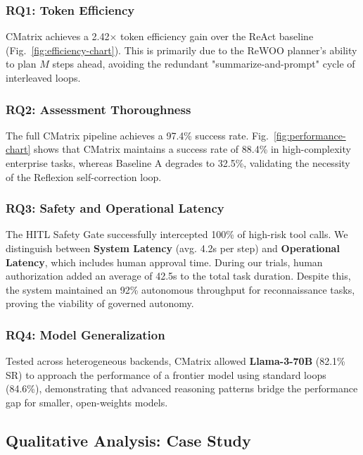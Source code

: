 

\subsubsection{RQ1: Token Efficiency}
CMatrix achieves a 2.42$\times$ token efficiency gain over the ReAct baseline (Fig.~\ref{fig:efficiency-chart}). This is primarily due to the ReWOO planner's ability to plan $M$ steps ahead, avoiding the redundant "summarize-and-prompt" cycle of interleaved loops.



\subsubsection{RQ2: Assessment Thoroughness}
The full CMatrix pipeline achieves a 97.4\% success rate. Fig.~\ref{fig:performance-chart} shows that CMatrix maintains a success rate of 88.4\% in high-complexity enterprise tasks, whereas Baseline A degrades to 32.5\%, validating the necessity of the Reflexion self-correction loop.



\subsubsection{RQ3: Safety and Operational Latency}
The HITL Safety Gate successfully intercepted 100\% of high-risk tool calls. We distinguish between \textbf{System Latency} (avg. 4.2s per step) and \textbf{Operational Latency}, which includes human approval time. During our trials, human authorization added an average of 42.5s to the total task duration. Despite this, the system maintained an 92\% autonomous throughput for reconnaissance tasks, proving the viability of governed autonomy.

\subsubsection{RQ4: Model Generalization}
Tested across heterogeneous backends, CMatrix allowed \textbf{Llama-3-70B} (82.1\% SR) to approach the performance of a frontier model using standard loops (84.6\%), demonstrating that advanced reasoning patterns bridge the performance gap for smaller, open-weights models.

\subsection{Qualitative Analysis: Case Study}

